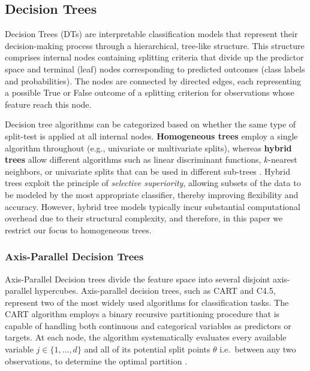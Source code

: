 \subsection{Decision Trees}\label{decision-trees}

Decision Trees (DTs) are interpretable classification models that represent their decision-making process through a hierarchical, tree-like structure. This structure comprises internal nodes containing splitting criteria that divide up the predictor space and terminal (leaf) nodes corresponding to predicted outcomes (class labels and probabilities). The nodes are connected by directed edges, each representing a possible True or False outcome of a splitting criterion for observations whose feature reach this node.

Decision tree algorithms can be categorized based on whether the same type of split-test is applied at all internal nodes. \textbf{Homogeneous trees} employ a single algorithm throughout (e.g., univariate or multivariate splits), whereas \textbf{hybrid trees} allow different algorithms such as linear discriminant functions, \(k\)-nearest neighbors, or univariate splits that can be used in different sub-trees \citep{brodley1995}. Hybrid trees exploit the principle of \emph{selective superiority}, allowing subsets of the data to be modeled by the most appropriate classifier, thereby improving flexibility and accuracy. However, hybrid tree models typically incur substantial computational overhead due to their structural complexity, and therefore, in this paper we restrict our focus to homogeneous trees.

\subsubsection{Axis-Parallel Decision Trees}\label{axis-parallel-decision-trees}

Axis-Parallel Decision trees divide the feature space into several disjoint axis-parallel hypercubes. Axis-parallel decision trees, such as CART and C4.5, represent two of the most widely used algorithms for classification tasks. The CART algorithm employs a binary recursive partitioning procedure that is capable of handling both continuous and categorical variables as predictors or targets. At each node, the algorithm systematically evaluates every available variable \(j \in \{1, \ldots, d\}\) and all of its potential split points \(\theta\) i.e.~between any two observations, to determine the optimal partition \citep{breiman1984}.

